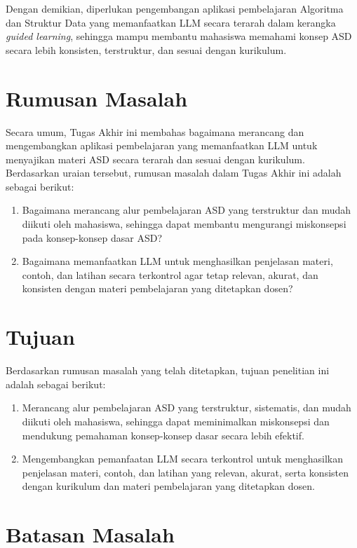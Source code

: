 Dengan demikian, diperlukan pengembangan aplikasi pembelajaran Algoritma dan Struktur Data yang memanfaatkan LLM secara terarah dalam kerangka \textit{guided learning}, sehingga mampu membantu mahasiswa memahami konsep ASD secara lebih konsisten, terstruktur, dan sesuai dengan kurikulum.

\section{Rumusan Masalah}

Secara umum, Tugas Akhir ini membahas bagaimana merancang dan mengembangkan aplikasi pembelajaran yang memanfaatkan LLM untuk menyajikan materi ASD secara terarah dan sesuai dengan kurikulum. Berdasarkan uraian tersebut, rumusan masalah dalam Tugas Akhir ini adalah sebagai berikut:

\begin{enumerate}
    \item Bagaimana merancang alur pembelajaran ASD yang terstruktur dan mudah diikuti oleh mahasiswa, sehingga dapat membantu mengurangi miskonsepsi pada konsep-konsep dasar ASD?
    \item Bagaimana memanfaatkan LLM untuk menghasilkan penjelasan materi, contoh, dan latihan secara terkontrol agar tetap relevan, akurat, dan konsisten dengan materi pembelajaran yang ditetapkan dosen?
\end{enumerate}

\section{Tujuan}

Berdasarkan rumusan masalah yang telah ditetapkan, tujuan penelitian ini adalah sebagai berikut:

\begin{enumerate}
    \item Merancang alur pembelajaran ASD yang terstruktur, sistematis, dan mudah diikuti oleh mahasiswa, sehingga dapat meminimalkan miskonsepsi dan mendukung pemahaman konsep-konsep dasar secara lebih efektif.
    \item Mengembangkan pemanfaatan LLM secara terkontrol untuk menghasilkan penjelasan materi, contoh, dan latihan yang relevan, akurat, serta konsisten dengan kurikulum dan materi pembelajaran yang ditetapkan dosen.
\end{enumerate}

\section{Batasan Masalah}

